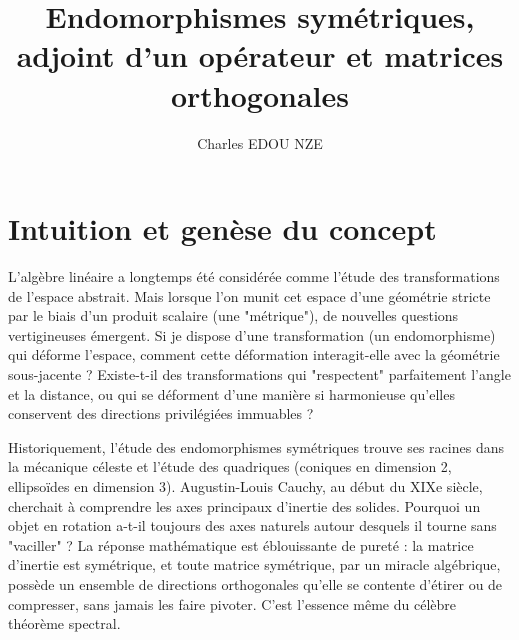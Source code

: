 \documentclass[11pt,a4paper]{article}
\title{Endomorphismes symétriques, adjoint d'un opérateur et matrices orthogonales}
\author{Charles EDOU NZE}
\date{}
\begin{document}
\maketitle
\tableofcontents
\newpage




\section{Intuition et genèse du concept}

\begin{center}
\end{center}


L'algèbre linéaire a longtemps été considérée comme l'étude des transformations de l'espace abstrait. Mais lorsque l'on munit cet espace d'une géométrie stricte par le biais d'un produit scalaire (une "métrique"), de nouvelles questions vertigineuses émergent. Si je dispose d'une transformation (un endomorphisme) qui déforme l'espace, comment cette déformation interagit-elle avec la géométrie sous-jacente ? Existe-t-il des transformations qui "respectent" parfaitement l'angle et la distance, ou qui se déforment d'une manière si harmonieuse qu'elles conservent des directions privilégiées immuables ?

Historiquement, l'étude des endomorphismes symétriques trouve ses racines dans la mécanique céleste et l'étude des quadriques (coniques en dimension 2, ellipsoïdes en dimension 3). Augustin-Louis Cauchy, au début du XIXe siècle, cherchait à comprendre les axes principaux d'inertie des solides. Pourquoi un objet en rotation a-t-il toujours des axes naturels autour desquels il tourne sans "vaciller" ? La réponse mathématique est éblouissante de pureté : la matrice d'inertie est symétrique, et toute matrice symétrique, par un miracle algébrique, possède un ensemble de directions orthogonales qu'elle se contente d'étirer ou de compresser, sans jamais les faire pivoter. C'est l'essence même du célèbre théorème spectral.
\end{document}
